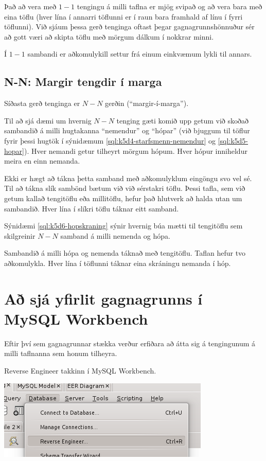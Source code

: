 Það að vera með $1-1$ tengingu á milli taflna er mjög svipað og að vera bara með eina töflu (hver lína í annarri töflunni er í raun bara framhald af línu í fyrri töflunni). Við sjáum þessa gerð tenginga oftast þegar gagnagrunnshönnuður sér að gott væri að skipta töflu með mörgum dálkum í nokkrar minni.

Í $1-1$ sambandi er aðkomulykill settur frá einum einkvæmum lykli til annars.
\subsection{N-N: Margir tengdir í marga}
Síðasta gerð tenginga er $N-N$ gerðin (``margir-í-marga'').

Til að sjá dæmi um hvernig $N-N$ tenging gæti komið upp getum við skoðað sambandið á milli hugtakanna ``nemendur'' og ``hópar'' (við bjuggum til töflur fyrir þessi hugtök í sýnidæmum \ref{sql:k5d4-starfsmenn-nemendur} og \ref{sql:k5d5-hopar}). Hver nemandi getur tilheyrt mörgum hópum. Hver hópur inniheldur meira en einn nemanda.

Ekki er hægt að tákna þetta samband með aðkomulyklum eingöngu svo vel sé. Til að tákna slík sambönd bætum við við sérstakri töflu. Þessi tafla, sem við getum kallað tengitöflu eða millitöflu, hefur það hlutverk að halda utan um sambandið. Hver lína í slíkri töflu táknar eitt samband.

Sýnidæmi \ref{sql:k5d6-hopskraning} sýnir hvernig búa mætti til tengitöflu sem skilgreinir $N-N$ samband á milli nemenda og hópa.

\begin{example}
\caption[Hópskráning: N-N]{Sambandið á milli hópa og nemenda táknað með tengitöflu. Taflan hefur tvo aðkomulykla. Hver lína í töflunni táknar eina skráningu nemanda í hóp.}
\label{sql:k5d6-hopskraning}
\centering
{}
\end{example}

\section{Að sjá yfirlit gagnagrunns í MySQL Workbench}
Eftir því sem gagnagrunnar stækka verður erfiðara að átta sig á tengingunum á milli taflnanna sem honum tilheyra.

\begin{marginfigure}
\caption[Workbench - Reverse Engineer takki]{Reverse Engineer takkinn í MySQL Workbench.}
\label{mynd:reverse-engineer}
\centering
\includegraphics[width=\linewidth]{myndir/workbench-reverse-engineer}
\end{marginfigure}

